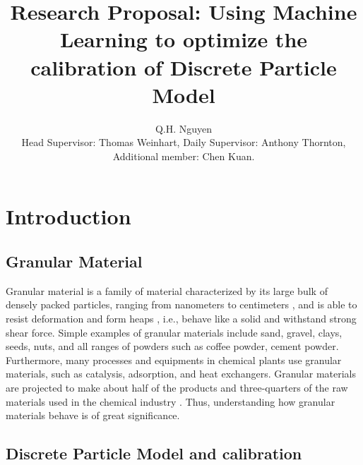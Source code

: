 \documentclass{article}
\title{Research Proposal: Using Machine Learning to optimize the calibration of Discrete Particle Model}
\author{Q.H. Nguyen\\[1ex] \small Head Supervisor: Thomas Weinhart, Daily Supervisor: Anthony Thornton, Additional member: Chen Kuan.}
\date{}
\begin{document}
\maketitle

\section{Introduction}


\subsection{Granular Material}

 Granular material is a family of material characterized by its large bulk of densely packed particles, ranging from nanometers to centimeters \cite{introGranular2}, and is able to resist deformation and form heaps \cite{introGranular3}, i.e., behave like a solid and withstand strong shear force. Simple examples of granular materials include sand, gravel, clays, seeds, nuts, and all ranges of powders such as coffee powder, cement powder. Furthermore, many processes and equipments in chemical plants use granular materials, such as catalysis, adsorption, and heat exchangers. Granular materials are projected to make about half of the products and three-quarters of the raw materials used in the chemical industry \cite{introGranular}. Thus, understanding how granular materials behave is of great significance.




\subsection{Discrete Particle Model and calibration}
\end{document}
